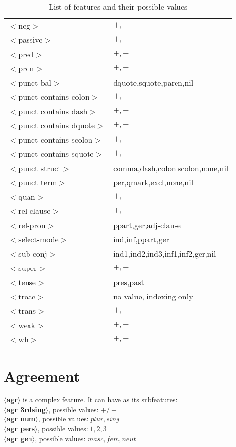 \begin{table}[hbt]
\begin{tabular}{|l|l|}
$<$neg$>$&$+,-$\\
$<$passive$>$&$+,-$\\
$<$pred$>$&$+,-$\\
$<$pron$>$&$+,-$\\
$<$punct bal$>$&dquote,squote,paren,nil\\
$<$punct contains colon$>$&$+,-$\\
$<$punct contains dash$>$&$+,-$\\
$<$punct contains dquote$>$&$+,-$\\
$<$punct contains scolon$>$&$+,-$\\
$<$punct contains squote$>$&$+,-$\\
$<$punct struct$>$&comma,dash,colon,scolon,none,nil\\
$<$punct term$>$&per,qmark,excl,none,nil\\
$<$quan$>$&$+,-$\\
$<$rel-clause$>$&$+,-$\\
$<$rel-pron$>$&ppart,ger,adj-clause\\
$<$select-mode$>$&ind,inf,ppart,ger\\
$<$sub-conj$>$&ind1,ind2,ind3,inf1,inf2,ger,nil\\
$<$super$>$&$+,-$\\
$<$tense$>$&pres,past\\
$<$trace$>$&no value, indexing only\\
$<$trans$>$&$+,-$\\
$<$weak$>$&$+,-$\\
$<$wh$>$&$+,-$\\
\hline
\end{tabular}
\caption{List of features and their possible values}
\label{feature-table}
\end{table}

\normalsize


\section{Agreement}
{\bf $\langle$agr$\rangle$} is a complex feature.
It can have as its subfeatures:\\
{\bf $\langle$agr 3rdsing$\rangle$}, possible values: {\bf $+/-$ }\\
{\bf $\langle$agr num$\rangle$}, possible values: {\bf $plur,sing$ }\\
{\bf $\langle$agr pers$\rangle$}, possible values: {\bf $1,2,3$ }\\
{\bf $\langle$agr gen$\rangle$}, possible values: {\bf $masc,fem,neut$ }

